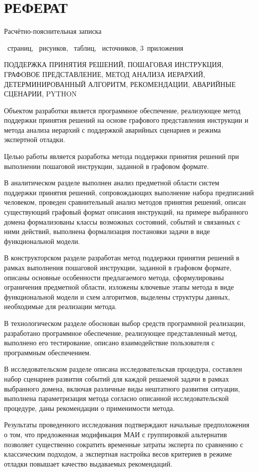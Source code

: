 \chapter*{РЕФЕРАТ}

\setcounter{page}{5}

Расчётно-пояснительная записка
\begin{NoHyper}\pageref{LastPage}\end{NoHyper}~страниц,
\totfig~рисунков,
\tottab~таблиц,
\thetotbibentries~источников,
3~приложения

ПОДДЕРЖКА ПРИНЯТИЯ РЕШЕНИЙ, ПОШАГОВАЯ ИНСТРУКЦИЯ, ГРАФОВОЕ ПРЕДСТАВЛЕНИЕ, МЕТОД АНАЛИЗА ИЕРАРХИЙ, ДЕТЕРМИНИРОВАННЫЙ АЛГОРИТМ, РЕКОМЕНДАЦИИ, АВАРИЙНЫЕ СЦЕНАРИИ, PYTHON

Объектом разработки является программное обеспечение, реализующее метод поддержки принятия решений на основе графового представления инструкции и метода анализа иерархий с поддержкой аварийных сценариев и режима экспертной отладки.

Целью работы является разработка метода поддержки принятия решений при выполнении пошаговой инструкции, заданной в графовом формате.

В аналитическом разделе выполнен анализ предметной области систем поддержки принятия решений, сопровождающих выполнение набора предписаний человеком, проведен сравнительный анализ методов принятия решений, описан существующий графовый формат описания инструкций, на примере выбранного домена формализованы классы возможных состояний, событий и связанных с ними действий, выполнена формализация постановки задачи в виде функциональной модели.

В конструкторском разделе разработан метод поддержки принятия решений в рамках выполнения пошаговой инструкции, заданной в графовом формате, описаны основные особенности предлагаемого метода, сформулированы ограничения предметной области, изложены ключевые этапы метода в виде функциональной модели и схем алгоритмов, выделены структуры данных, необходимые для реализации метода.

В технологическом разделе обоснован выбор средств программной реализации, разработано программное обеспечение, реализующее представленный метод, выполнено его тестирование, описано взаимодействие пользователя с программным обеспечением.

В исследовательском разделе описана исследовательская процедура, составлен набор сценариев развития событий для каждой решаемой задачи в рамках выбранного домена, включая различные виды нештатного развития ситуации, выполнена параметризация метода согласно описанной исследовательской процедуре, даны рекомендации о применимости метода.

Результаты проведенного исследования подтверждают начальные предположения о том, что предложенная модификация МАИ с группировкой альтернатив позволяет существенно сократить временные затраты эксперта по сравнению с классическим подходом, а экспертная настройка весов критериев в режиме отладки повышает качество выдаваемых рекомендаций.

